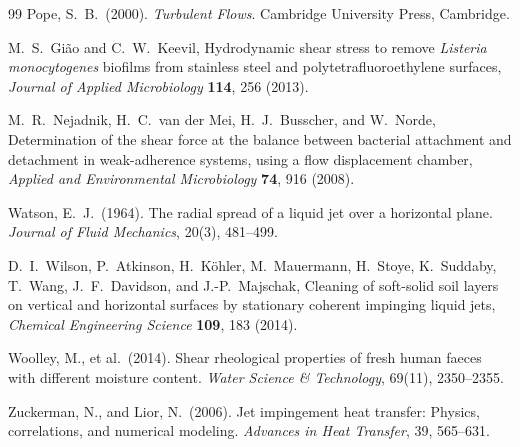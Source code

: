 \documentclass[aps,prfluids,reprint,amsmath,amssymb,floatfix]{revtex4-2}
\begin{document}
\begin{thebibliography}{99}
Pope, S.~B.\ (2000).
\textit{Turbulent Flows}.
Cambridge University Press, Cambridge.

M.~S.~Gi\~{a}o and C.~W.~Keevil, Hydrodynamic shear stress to remove
\textit{Listeria monocytogenes} biofilms from stainless steel and
polytetrafluoroethylene surfaces,
\textit{Journal of Applied Microbiology} \textbf{114}, 256 (2013).

M.~R.~Nejadnik, H.~C.~van der Mei, H.~J.~Busscher, and W.~Norde,
Determination of the shear force at the balance between bacterial attachment
and detachment in weak-adherence systems, using a flow displacement chamber,
\textit{Applied and Environmental Microbiology} \textbf{74}, 916 (2008).

Watson, E.~J.\ (1964).
The radial spread of a liquid jet over a horizontal plane.
\textit{Journal of Fluid Mechanics}, 20(3), 481--499.

D.~I.~Wilson, P.~Atkinson, H.~K\"ohler, M.~Mauermann, H.~Stoye, K.~Suddaby,
T.~Wang, J.~F.~Davidson, and J.-P.~Majschak, Cleaning of soft-solid soil
layers on vertical and horizontal surfaces by stationary coherent impinging
liquid jets, \textit{Chemical Engineering Science} \textbf{109}, 183 (2014).

Woolley, M., et al.\ (2014).
Shear rheological properties of fresh human faeces with different
moisture content.
\textit{Water Science \& Technology}, 69(11), 2350--2355.

Zuckerman, N., and Lior, N.\ (2006).
Jet impingement heat transfer: Physics, correlations, and numerical
modeling.
\textit{Advances in Heat Transfer}, 39, 565--631.

\end{thebibliography}
\end{document}
